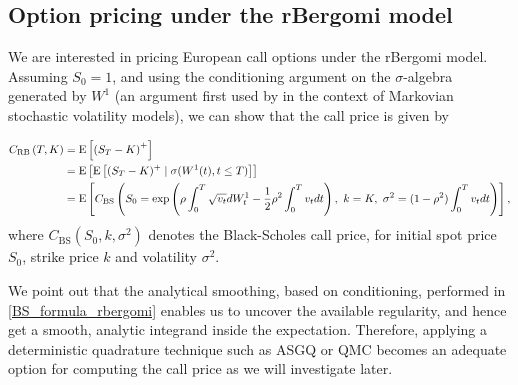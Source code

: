 \subsection{Option pricing under the rBergomi model}\label{sec:Option pricing under rBergomi model}

We are interested in pricing European call options under the rBergomi model. Assuming $S_0 = 1$, and using the conditioning argument on the $\sigma$-algebra generated by $W^1$ (an argument first used by \cite{romano1997contingent} in the context of Markovian stochastic volatility  models), we can  show that the call price is given by

\begin{align}\label{BS_formula_rbergomi}
	C_{\text{RB}}\left( T, K \right) &= \text{E}\left[ \left(S_T - K \right)^+ \right]  \nonumber\\
	&=\mathrm{E}\left[\mathrm{E}\left[(S_T-K)^+ \mid \sigma(W^1(t) ,t \le T)\right]\right]\nonumber \\
	&=\text{E}\left[C_{\text{BS}}\left( S_0 = \operatorname{exp}\left(\rho \int_0^T \sqrt{v_t} dW_t^1 - \frac{1}{2}
	\rho^2 \int_0^T v_t dt\right),\ k = K, \ \sigma^2 = (1-\rho^2)
	\int_0^T v_t dt \right) \right],
\end{align}
where $C_{\text{BS}}(S_0,k,\sigma^2)$ denotes the Black-Scholes call price, for initial spot price $S_0$, strike price $k$ and volatility $\sigma^2$.


We point out that the analytical smoothing, based on conditioning, performed in \eqref{BS_formula_rbergomi} enables us to uncover the available regularity, and hence  get a smooth, analytic integrand inside the expectation. Therefore, applying a deterministic quadrature technique such as ASGQ or QMC becomes an adequate option for computing the call price as we will investigate later.

